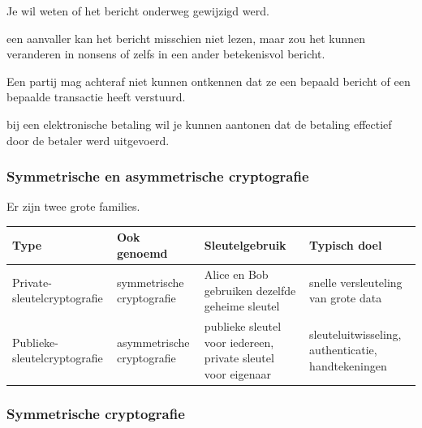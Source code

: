 Je wil weten of het bericht onderweg gewijzigd werd.

\textbf{} een aanvaller kan het bericht misschien niet lezen, maar zou het kunnen veranderen in nonsens of zelfs in een ander betekenisvol bericht.


Een partij mag achteraf niet kunnen ontkennen dat ze een bepaald bericht of een bepaalde transactie heeft verstuurd.

\textbf{} bij een elektronische betaling wil je kunnen aantonen dat de betaling effectief door de betaler werd uitgevoerd.

\subsubsection{Symmetrische en asymmetrische cryptografie}

Er zijn twee grote families.

\begin{center}
    \renewcommand{\arraystretch}{1.5}
    \begin{tabularx}{\linewidth}{@{} >{\hsize}L >{\hsize}L >{\hsize}L >{\hsize}L @{}}
        \textbf{Type} & \textbf{Ook genoemd} & \textbf{Sleutelgebruik} & \textbf{Typisch doel} \\
        \hline
        Private-sleutelcryptografie & symmetrische cryptografie & Alice en Bob gebruiken dezelfde geheime sleutel & snelle versleuteling van grote data \\
        \thinrule
        Publieke-sleutelcryptografie & asymmetrische cryptografie & publieke sleutel voor iedereen, private sleutel voor eigenaar & sleuteluitwisseling, authenticatie, handtekeningen \\
        \hline
    \end{tabularx}
\end{center}

\subsubsection{Symmetrische cryptografie}

